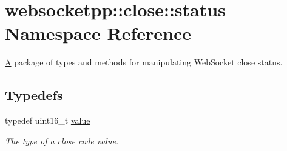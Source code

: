 \hypertarget{namespacewebsocketpp_1_1close_1_1status}{}\section{websocketpp\+:\+:close\+:\+:status Namespace Reference}
\label{namespacewebsocketpp_1_1close_1_1status}


\mbox{\hyperlink{struct_a}{A}} package of types and methods for manipulating Web\+Socket close status\textquotesingle{}.  


\subsection*{Typedefs}
\begin{DoxyCompactItemize}
\item 
\mbox{\label{namespacewebsocketpp_1_1close_1_1status_a8614a5c4733d708e2d2a32191c5bef84}} 
typedef uint16\+\_\+t \mbox{\hyperlink{namespacewebsocketpp_1_1close_1_1status_a8614a5c4733d708e2d2a32191c5bef84}{value}}
\begin{DoxyCompactList}\small\item\em The type of a close code value. \end{DoxyCompactList}\end{DoxyCompactItemize}

